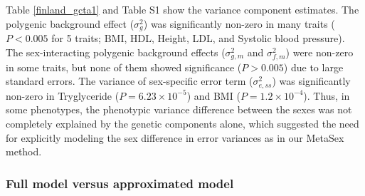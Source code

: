 \documentclass[11pt]{article}
\begin{document}


Table \ref{finland_gcta1} and Table S1 show the variance component estimates.
The polygenic background effect ($\sigma^2_g$) was significantly non-zero in many traits
($P<0.005$ for 5 traits; BMI, HDL, Height, LDL, and Systolic blood pressure).
The sex-interacting polygenic background effects ($\sigma^2_{g,m}$ and $\sigma^2_{f,m}$) 
were non-zero in some traits,
but none of them showed significance ($P>0.005$) due to large standard errors.
The variance of sex-specific error term ($\sigma^2_{e,ss}$) was significantly non-zero in Tryglyceride ($P=6.23 \times 10^{-5}$) and BMI ($P=1.2 \times 10^{-4}$).
Thus, in some phenotypes, 
the phenotypic variance difference between the sexes was not completely explained by the genetic components alone,
which suggested the need for explicitly modeling the sex difference in error variances as in our MetaSex method.


\subsubsection*{Full model versus approximated model}

%
\end{document}
